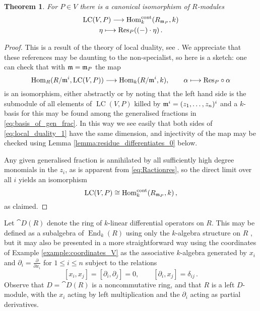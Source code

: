 \documentclass[english,letter paper,12pt,reqno]{article}
\newtheorem{theorem}{Theorem}[section]
\theoremstyle{example}
\numberwithin{equation}{section}
\def\Hom{\operatorname{Hom}}
\DeclareMathOperator{\End}{End}
\DeclareMathOperator{\LC}{LC}
\begin{document}
\begin{theorem}\label{theorem:lcwithcontmap} For $P \in V$ there is a canonical isomorphism of $R$-modules
\begin{gather}
\LC(V,P) \lto \Hom_k^{\cont}(R_{\mf{m}_P},k)\label{eq:local_duality}\\
\eta \longmapsto \Res_P( ( - ) \cdot \eta )\,.\nonumber
\end{gather}
\end{theorem}
\begin{proof}
This is a result of the theory of local duality, see \cite{Lipman01, Kunz08}. We appreciate that these references may be daunting to the non-specialist, so here is a sketch: one can check that with $\mathfrak{m} = \mathfrak{m}_P$ the map
\begin{equation}\label{eq:local_duality_1}
\Hom_R( R/\mf{m}^i, \LC(V,P) ) \lto \Hom_k( R/\mf{m}^i, k ), \qquad \alpha \longmapsto \Res_P \circ \alpha
\end{equation}
is an isomorphism, either abstractly \cite[Proposition 0.4]{Salas02} or by noting that the left hand side is the submodule of all elements of $\LC(V,P)$ killed by $\mathfrak{m}^i = (z_1,\ldots,z_n)^i$ and a $k$-basis for this may be found among the generalised fractions in \eqref{eq:basis_of_gen_frac}. In this way we see easily that both sides of \eqref{eq:local_duality_1} have the same dimension, and injectivity of the map may be checked using Lemma \ref{lemma:residue_differentiates_0} below.

Any given generalised fraction is annihilated by all sufficiently high degree monomials in the $z_i$, as is apparent from \eqref{eq:Ractionres}, so the direct limit over all $i$ yields an isomorphism
\[
\LC(V,P) \cong \Hom_k^{\cont}(R_{\mf{m}_P}, k)\,,
\]
as claimed.
\end{proof}

Let $\cat{D}(R)$ denote the ring of $k$-linear differential operators on $R$. This may be defined as a subalgebra of $\End_k(R)$ using only the $k$-algebra structure on $R$ \cite{milicic}, but it may also be presented in a more straightforward way using the coordinates of Example \ref{example:coordinates_V} as the associative $k$-algebra generated by $x_i$ and $\partial_i = \frac{\partial}{\partial x_i}$ for $1 \le i \le n$ subject to the relations
\[
[x_i, x_j] = [\partial_i, \partial_j] = 0, \qquad [\partial_i, x_j] = \delta_{ij}\,.
\]
Observe that $D = \cat{D}(R)$ is a noncommutative ring, and that $R$ is a left $D$-module, with the $x_i$ acting by left multiplication and the $\partial_i$ acting as partial derivatives.
\end{document}
